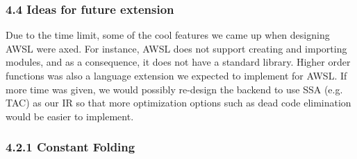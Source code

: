 \documentclass[10pt,a4paper,]{report}
\newenvironment{tabularverbatim}
 {\VerbatimEnvironment
  \begin{BVerbatim}[baseline=c,formatcom=\setlength{\baselineskip}{\normalbaselineskip}]}
 {\end{BVerbatim}}
\begin{document}
  \subsubsection*{4.4 Ideas for future extension}
  Due to the time limit, some of the cool features we came up when designing
  AWSL were axed. For instance, AWSL does not support creating and importing
  modules, and as a consequence, it does not have a standard library. Higher
  order functions was also a language extension we expected to implement for
  AWSL. If more time was given, we would possibly re-design the backend to use
  SSA (e.g. TAC) as our IR so that more optimization options such as dead code
  elimination would be easier to implement.

  \appendixpage

  \subsubsection*{4.2.1 Constant Folding}
  \begin{center}
  \end{center}
\end{document}
